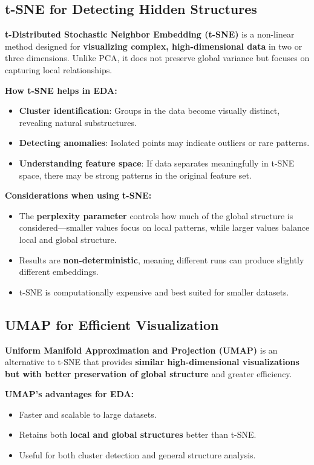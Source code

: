 \documentclass[12pt,openany]{book}
\begin{document}
\subsection{t-SNE for Detecting Hidden Structures}

\textbf{t-Distributed Stochastic Neighbor Embedding (t-SNE)} is a non-linear method designed for \textbf{visualizing complex, high-dimensional data} in two or three dimensions. Unlike PCA, it does not preserve global variance but focuses on capturing local relationships.

\textbf{How t-SNE helps in EDA:}
\begin{itemize}
    \item \textbf{Cluster identification}: Groups in the data become visually distinct, revealing natural substructures.
    \item \textbf{Detecting anomalies}: Isolated points may indicate outliers or rare patterns.
    \item \textbf{Understanding feature space}: If data separates meaningfully in t-SNE space, there may be strong patterns in the original feature set.
\end{itemize}

\textbf{Considerations when using t-SNE:}
\begin{itemize}
    \item The \textbf{perplexity parameter} controls how much of the global structure is considered—smaller values focus on local patterns, while larger values balance local and global structure.
    \item Results are \textbf{non-deterministic}, meaning different runs can produce slightly different embeddings.
    \item t-SNE is computationally expensive and best suited for smaller datasets.
\end{itemize}

\subsection{UMAP for Efficient Visualization}

\textbf{Uniform Manifold Approximation and Projection (UMAP)} is an alternative to t-SNE that provides \textbf{similar high-dimensional visualizations but with better preservation of global structure} and greater efficiency.

\textbf{UMAP’s advantages for EDA:}
\begin{itemize}
    \item Faster and scalable to large datasets.
    \item Retains both \textbf{local and global structures} better than t-SNE.
    \item Useful for both cluster detection and general structure analysis.
\end{itemize}
\end{document}
